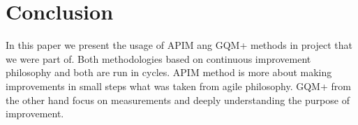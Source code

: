 \section{Conclusion}

In this paper we present the usage of APIM ang GQM+ methods in project that we were part of. Both methodologies based on continuous improvement philosophy and both are run in cycles. APIM method is more about making improvements in small steps what was taken from agile philosophy.  GQM+ from the other hand focus on measurements and deeply understanding the purpose of improvement. 